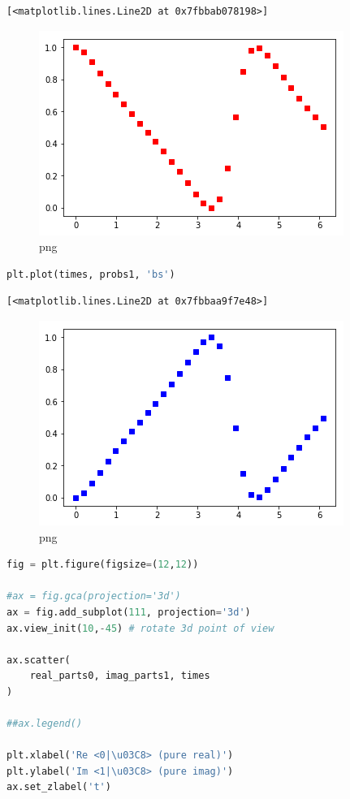 \begin{lstlisting}
[<matplotlib.lines.Line2D at 0x7fbbab078198>]
\end{lstlisting}

\begin{figure}
\centering
\includegraphics[width=0.66\linewidth]{output_83_1.png}
\caption[]{png}
\end{figure}

\begin{lstlisting}[language=Python]
plt.plot(times, probs1, 'bs')
\end{lstlisting}

\begin{lstlisting}
[<matplotlib.lines.Line2D at 0x7fbbaa9f7e48>]
\end{lstlisting}

\begin{figure}
\centering
\includegraphics[width=0.66\linewidth]{output_84_1.png}
\caption[]{png}
\end{figure}

\begin{lstlisting}[language=Python]
fig = plt.figure(figsize=(12,12))

#ax = fig.gca(projection='3d')
ax = fig.add_subplot(111, projection='3d')
ax.view_init(10,-45) # rotate 3d point of view

ax.scatter(
    real_parts0, imag_parts1, times
)

##ax.legend()

plt.xlabel('Re <0|\u03C8> (pure real)')
plt.ylabel('Im <1|\u03C8> (pure imag)')
ax.set_zlabel('t')
\end{lstlisting}

